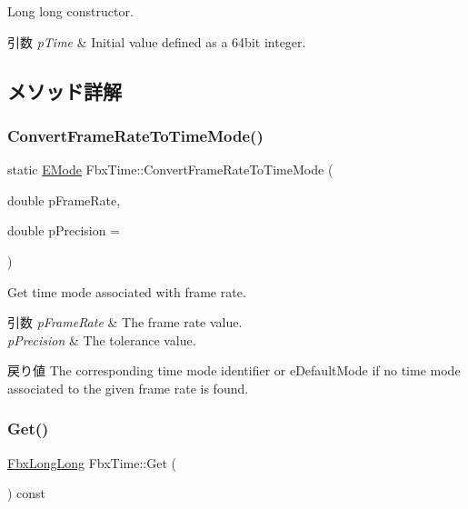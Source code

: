 Long long constructor. 
\begin{DoxyParams}{引数}
{\em p\+Time} & Initial value defined as a 64bit integer. \\
\hline
\end{DoxyParams}


\subsection{メソッド詳解}
\mbox{\label{class_fbx_time_aac990ffad2cf969b6c1003cce20087e5}} 
\subsubsection{\texorpdfstring{Convert\+Frame\+Rate\+To\+Time\+Mode()}{ConvertFrameRateToTimeMode()}}
{\footnotesize\ttfamily static \hyperlink{class_fbx_time_acc529b00a0e8d4c3da3702449ca93031}{E\+Mode} Fbx\+Time\+::\+Convert\+Frame\+Rate\+To\+Time\+Mode (\begin{DoxyParamCaption}\item[{double}]{p\+Frame\+Rate,  }\item[{double}]{p\+Precision = {} }\end{DoxyParamCaption})\hspace{0.3cm}{\ttfamily [static]}}

Get time mode associated with frame rate. 
\begin{DoxyParams}{引数}
{\em p\+Frame\+Rate} & The frame rate value. \\
\hline
{\em p\+Precision} & The tolerance value. \\
\hline
\end{DoxyParams}
\begin{DoxyReturn}{戻り値}
The corresponding time mode identifier or {\ttfamily e\+Default\+Mode} if no time mode associated to the given frame rate is found. 
\end{DoxyReturn}
\mbox{\label{class_fbx_time_a17447886f905390b991a2d48ddb5a375}} 
\subsubsection{\texorpdfstring{Get()}{Get()}}
{\footnotesize\ttfamily \hyperlink{fbxtypes_8h_ac34da60c22b0a7e1156e5480da7d71f1}{Fbx\+Long\+Long} Fbx\+Time\+::\+Get (\begin{DoxyParamCaption}{ }\end{DoxyParamCaption}) const}

